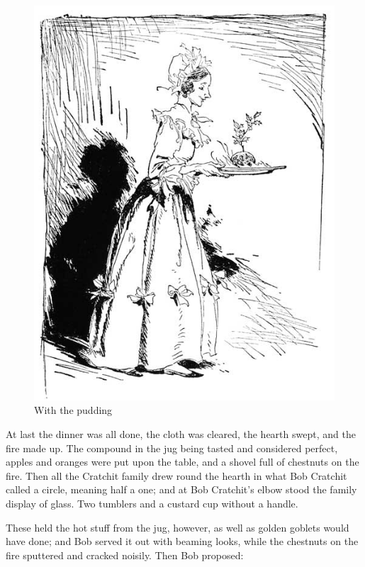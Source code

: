\documentclass[paper=5.5in:8.5in,BCOR=15mm,twoside,DIV=15,headinclude=off,12pt,chapterprefix=off,openany,headings=huge]{scrbook} %
\begin{document}
\begin{figure}
\begin{minipage}[c]{\linewidth}
\includegraphics[width=\linewidth]{gs113}
\caption*{With the pudding}
\end{minipage}
\end{figure}

At last the dinner was all done, the cloth was cleared, the hearth swept, and the fire made up. The compound in the jug being tasted and considered perfect, apples and oranges were put upon the table, and a shovel full of chestnuts on the fire. Then all the Cratchit family drew round the hearth in what Bob Cratchit called a circle, meaning half a one; and at Bob Cratchit's elbow stood the family display of glass. Two tumblers and a custard cup without a handle.

These held the hot stuff from the jug, however, as well as golden goblets would have done; and Bob served it out with beaming looks, while the chestnuts on the fire sputtered and cracked noisily. Then Bob proposed:
\end{document}
